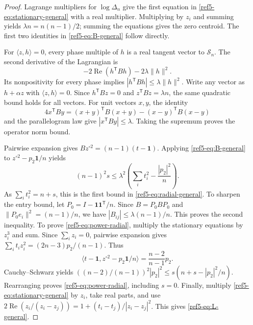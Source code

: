 \documentclass[11pt]{article}
\theoremstyle{remark}
\newcommand{\one}{\mathbf 1}
\newcommand{\norm}[1]{\lVert#1\rVert}
\newcommand{\ip}[2]{\langle#1,#2\rangle}
\newcommand{\Rea}{\operatorname{Re}}
\numberwithin{equation}{section}
\begin{document}
\begin{proof}
Lagrange multipliers for $\log\Delta_n$ give the first equation
in \eqref{ref5-eq:stationary-general} with a real multiplier.
Multiplying by $z_i$ and summing yields
$\lambda n=n(n-1)/2$; summing the equations gives the zero centroid.
The first two identities in \eqref{ref5-eq:B-general} follow directly.

For $\ip{z}{h}=0$, every phase multiple of $h$ is a real tangent vector
to $\mathcal S_n$. The second derivative of the Lagrangian is
\[
 -2\Rea(h^{\mathsf T}Bh)-2\lambda\norm{h}^2.
\]
Its nonpositivity for every phase implies
$|h^{\mathsf T}Bh|\le\lambda\norm h^2$.
Write any vector as $h+\alpha z$ with $\ip z h=0$.
Since $h^{\mathsf T}Bz=0$ and $z^{\mathsf T}Bz=\lambda n$,
the same quadratic bound holds for all vectors.
For unit vectors $x,y$, the identity
\[
4x^{\mathsf T}By=(x+y)^{\mathsf T}B(x+y)
 -(x-y)^{\mathsf T}B(x-y)
\]
and the parallelogram law give $|x^{\mathsf T}By|\le\lambda$.
Taking the supremum proves the operator norm bound.

Pairwise expansion gives
$Bz^{\circ2}=(n-1)(t-\one)$. Applying \eqref{ref5-eq:B-general} to
$z^{\circ2}-p_2\one/n$ yields
\[
 (n-1)^2s\le\lambda^2
 \left(\sum_i t_i^2-\frac{|p_2|^2}{n}\right).
\]
As $\sum_i t_i^2=n+s$, this is the first bound in
\eqref{ref5-eq:radial-general}. To sharpen the entry bound, let
$P_0=I-\one\one^{\mathsf T}/n$. Since $B=P_0BP_0$ and
$\norm{P_0e_i}^2=(n-1)/n$, we have
$|B_{ij}|\le\lambda(n-1)/n$.
This proves the second inequality.
To prove \eqref{ref5-eq:power-radial}, multiply the stationary equations
by $z_i^3$ and sum. Since $\sum_i z_i=0$, pairwise expansion gives
$\sum_i t_i z_i^2=(2n-3)p_2/(n-1)$. Thus
\[
 \ip{t-\one}{z^{\circ2}-p_2\one/n}
   =\frac{n-2}{n-1}p_2.
\]
Cauchy--Schwarz yields
$((n-2)/(n-1))^2|p_2|^2
 \le s(n+s-|p_2|^2/n)$.
Rearranging proves \eqref{ref5-eq:power-radial}, including $s=0$.
Finally, multiply \eqref{ref5-eq:stationary-general} by $z_i$, take real
parts, and use
$2\Rea(z_i/(z_i-z_j))=1+(t_i-t_j)/|z_i-z_j|^2$.
This gives \eqref{ref5-eq:L-general}.
\end{proof}
\end{document}
